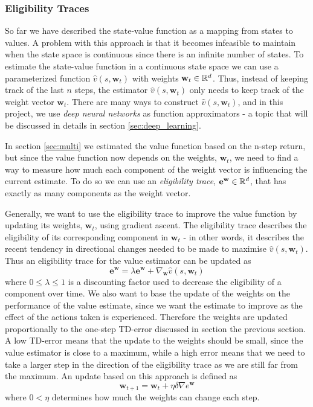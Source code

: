 \documentclass[11pt]{article}
\begin{document}
\subsubsection{Eligibility Traces}\label{sec:et}

So far we have described the state-value function as a mapping from states to values.
A problem with this approach is that it becomes infeasible to maintain 
when the state space is continuous since there is an infinite number of states.
To estimate the state-value function in a continuous state space we can use a
parameterized function $\hat{v}(s, \mathbf{w}_t)$ with weights $\mathbf{w}_t \in \mathbb{R}^d$.
Thus, instead of keeping track of the last $n$ steps, the estimator $\hat{v}(s, \mathbf{w}_t)$
only needs to keep track of the weight vector $\mathbf{w}_t$.
There are many ways to construct $\hat{v}(s, \mathbf{w}_t)$, and in this project, we use \textit{deep neural networks}
as function approximators - a topic that will be discussed in details in section \ref{sec:deep_learning}.

In section \ref{sec:multi} we estimated the value function based on the n-step return, but
since the value function now depends on the weights, $\mathbf{w}_t$, we need to find a way
to measure how much each component of the weight vector is influencing the
current estimate.
To do so we can use an \textit{eligibility trace}, $\mathbf{e}^{\mathbf{w}} \in \mathbb{R}^d$, that
has exactly as many components as the weight vector.

Generally, we want to use the eligibility trace to improve the value function by
updating its weights, $\mathbf{w}_t$, using gradient ascent.
The eligibility trace describes the eligibility of its corresponding component in $\mathbf{w}_t$
- in other words, it describes the recent tendency in directional changes needed to be made
to maximise $\hat{v}(s, \mathbf{w}_t)$.
Thus an eligibility trace for the value estimator can be updated as
\begin{equation}
    \mathbf{e}^\mathbf{w} = \lambda \mathbf{e}^\mathbf{w} + \nabla_\mathbf{w} \hat{v}(s, \mathbf{w}_t)
\end{equation}
where $0 \leq \lambda \leq 1$ is a discounting factor used to decrease the eligibility of a component
over time.
We also want to base the update of the weights on the performance of the value estimate,
since we want the estimate to improve as the effect of the actions taken is experienced.
Therefore the weights are updated proportionally to the one-step TD-error discussed in section the previous
section.
A low TD-error means that the update to the weights should be small, since the value estimator is
close to a maximum, while a high error means that we need to take a larger step
in the direction of the eligibility trace as we are still far from the maximum.
An update based on this approach is defined as
\begin{equation}
    \mathbf{w}_{t+1} = \mathbf{w}_t + \eta \delta \nabla e^\mathbf{w}
\end{equation}
where $0 < \eta$ determines how much the weights can change each step.
\end{document}
